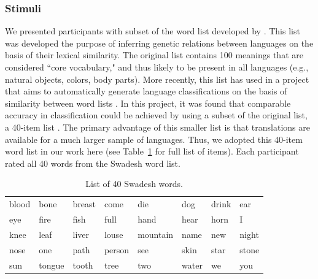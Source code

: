 \subsubsection{Stimuli}
We presented participants with subset of the word list developed by . This list was developed  the purpose of inferring genetic relations between languages on the basis of their lexical similarity. The original list contains 100 meanings that are considered ``core vocabulary," and thus likely to be present in all languages (e.g., natural objects, colors, body parts). More recently, this list has used in a project that aims to automatically generate language classifications on the basis of similarity between word lists \cite{brown2008automated}. In this project, it was found that comparable accuracy in classification could be achieved by using a subset of the original list, a 40-item list \cite{holman2008explorations}. The primary advantage of this smaller list is that translations are available for a much larger sample of languages. Thus, we adopted this 40-item word list in our work here (see Table~\ref{tab:swadeshwords} for full list of items). Each participant rated all 40 words from the  Swadesh word list. 

\begin{table}[t!]
\centering
\begin{tabular}{llllllll}
 \hline
blood  &  bone   &  breast   & come &    die    &  dog &     drink &  ear   \\
eye   &   fire   &  fish    & full   &  hand  &   hear &    horn  &   I  \\
knee  &   leaf   &  liver  &  louse  &  mountain  &name   &  new   &   night  \\
nose     &one    &  path     &person  & see    &  skin &    star  &   stone \\
sun  &    tongue  & tooth  & tree &    two      &water &   we    &   you     \\
 \hline
\end{tabular}
\caption{List of 40 Swadesh words.}
\label{tab:swadeshwords}
\end{table}

